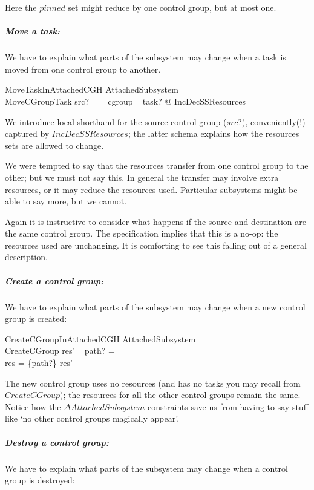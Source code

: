 \documentclass[a4paper,twoside,12pt]{article}
\begin{document}
Here the $pinned$ set might reduce by one control group, but at most one.

\subparagraph{Move a task:}
We have to explain what parts of the subsystem may change when a task is moved from one control group to another.

\begin{schema}{MoveTaskInAttachedCGH}
\Delta AttachedSubsystem \\
MoveCGroupTask
\where
\LET src? == cgroup ~ task? @ IncDecSSResources
\end{schema}
We introduce local shorthand for the source control group ($src?$), conveniently(!) captured by $IncDecSSResources$;
the latter schema explains how the resources sets are allowed to change.

We were tempted to say that the resources transfer from one control group to the other; but we must not say this.
In general the transfer may involve extra resources, or it may reduce the resources used. Particular
subsystems might be able to say more, but we cannot.

Again it is instructive to consider what happens if the source and destination are the same control group. 
The specification implies that this is a no-op: the resources used are unchanging. 
It is comforting to see this falling out of a general description.

\subparagraph{Create a control group:}
We have to explain what parts of the subsystem may change when a new control group is created:

\begin{schema}{CreateCGroupInAttachedCGH}
\Delta AttachedSubsystem \\
CreateCGroup
\where
res' ~ path? = \emptyset \\
res = \{path?\} \ndres res'
\end{schema}
The new control group uses no resources (and has no tasks you may recall from $CreateCGroup$); the resources
for all the other control groups remain the same. Notice how the $\Delta AttachedSubsystem$ constraints save us
from having to say stuff like `no other control groups magically appear'.

\subparagraph{Destroy a control group:}
We have to explain what parts of the subsystem may change when a control group is destroyed:
\end{document}
